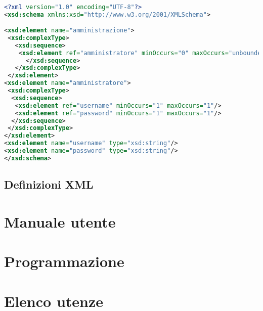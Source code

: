 \documentclass [a4paper,11pt]{book}
\begin{document}
\begin{lstlisting}[language=XML]

<?xml version="1.0" encoding="UTF-8"?>
<xsd:schema xmlns:xsd="http://www.w3.org/2001/XMLSchema">

<xsd:element name="amministrazione">
 <xsd:complexType>
   <xsd:sequence>
    <xsd:element ref="amministratore" minOccurs="0" maxOccurs="unbounded" />
      </xsd:sequence>
   </xsd:complexType>
 </xsd:element>
<xsd:element name="amministratore">
 <xsd:complexType>
  <xsd:sequence>
   <xsd:element ref="username" minOccurs="1" maxOccurs="1"/>
   <xsd:element ref="password" minOccurs="1" maxOccurs="1"/>
  </xsd:sequence>
 </xsd:complexType>
</xsd:element>
<xsd:element name="username" type="xsd:string"/>
<xsd:element name="password" type="xsd:string"/>
</xsd:schema>
\end{lstlisting}
\section{Definizioni XML}

\chapter{Manuale utente}

\chapter{Programmazione}

\chapter{Elenco utenze}
\end{document}
